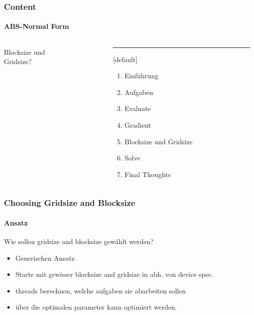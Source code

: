 \begin{frame}
	\frametitle{Content}
	\framesubtitle{ABS-Normal Form}
	\begin{columns}[T] %
		\begin{column}{.48\textwidth}
			
			\begin{center}
				{\Huge Blocksize und \\ Gridsize?}
			\end{center}
			
		\end{column}%
		\hfill%
		\begin{column}{.48\textwidth}
			\color{blue}\rule{\linewidth}{4pt}
			
			\begin{enumerate}
				\item Einführung
				\item Aufgaben
				\item Evaluate
				\item Gradient
				\item Blocksize und Gridsize
				\item Solve
				\item Final Thoughts
			\end{enumerate}
		\end{column}%
	\end{columns}
\end{frame}
\begin{frame}
	\frametitle{Choosing Gridsize and Blocksize}
	\framesubtitle{Ansatz}
	Wie sollen gridsize and blocksize gewählt werden?
	\begin{itemize}
		\item <2-> Generischen Ansatz
		\item <3-> Starte mit gewisser blocksize and gridsize in abh. von device spec.
		\item <4-> threads berechnen, welche aufgaben sie abarbeiten sollen
		\item <5-> über die optimalen parameter kann optimiert werden.
	\end{itemize}
\end{frame}
